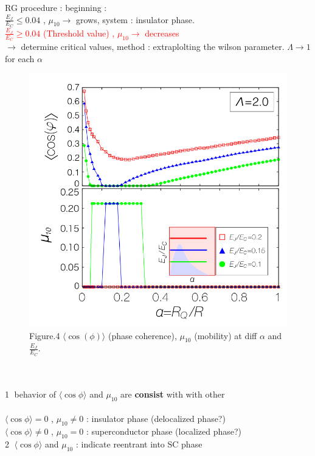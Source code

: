 \documentclass{article}
\begin{document}
RG procedure : beginning :\\
\textcolor[rgb]{0,0,1.0}{ $\frac{E_J}{E_C} \leq 0.04 $ , $\mu_{10} \rightarrow$ grows, system : insulator phase.}\\
\textcolor{red}{$\frac{E_J}{E_C} \geq 0.04 $ (Threshold value) , $\mu_{10} \rightarrow$ decreases}\\
$\rightarrow$ determine critical values, method : extraplolting the wilson parameter. $\Lambda \rightarrow 1$ for each $\alpha$
\begin{figure}[!h]
    \centerline{\includegraphics[width=\columnwidth]{Phy129087001_3.png}}
    \caption{Figure.4 $\langle \cos (\phi) \rangle$ (phase coherence), $\mu_{10}$ (mobility) at diff $\alpha$ and $\frac{E_J}{E_C}$.}
    \label{figure_4} 
\end{figure}
\\
 \\
\textcircled{1} behavior of $\langle \cos{\phi} \rangle$ and $\mu_{10}$ are \textbf{consist} with with other\\
\\
$\langle \cos{\phi} \rangle = 0$ , $\mu_{10} \neq 0$ : insulator phase (delocalized phase?)\\
$\langle \cos{\phi} \rangle \neq 0$ , $\mu_{10} = 0$ : superconductor phase (localized phase?)\\
\textcircled{2} $\langle \cos{\phi} \rangle$ and $\mu_{10}$ : indicate reentrant into SC phase\\
\end{document}
